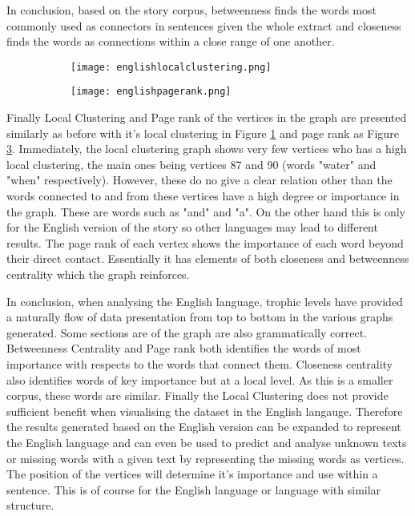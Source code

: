 In conclusion, based on the story corpus, betweenness finds the words most commonly used as connectors in sentences given the whole extract and closeness finds the words as connections within a close range of one another.

\begin{figure}[H]
\centering
\begin{subfigure}{.45\textwidth}
	\hspace{-1cm} 
	\texttt{[image: englishlocalclustering.png]}
	\caption{}
	\label{fig:englc}
\end{subfigure}
\hfill
\begin{subfigure}{.45\textwidth}
	\hspace{-1cm} 
	\texttt{[image: englishpagerank.png]}
	\caption{}
	\label{fig:engpr}
\end{subfigure}
\end{figure}

Finally Local Clustering and Page rank of the vertices in the graph are presented similarly as before with it's local clustering in Figure \ref{fig:englc} and page rank as Figure \ref{fig:engpr}. Immediately, the local clustering graph shows very few vertices who has a high local clustering, the main ones being vertices 87 and 90 (words "water" and "when" respectively). However, these do no give a clear relation other than the words connected to and from these vertices have a high degree or importance in the graph. These are words such as "and" and "a". On the other hand this is only for the English version of the story so other languages may lead to different results. The page rank of each vertex shows the importance of each word beyond their direct contact. Essentially it has elements of both closeness and betweenness centrality which the graph reinforces.

In conclusion, when analysing the English language, trophic levels have provided a naturally flow of data presentation from top to bottom in the various graphs generated. Some sections are of the graph are also grammatically correct. Betweenness Centrality and Page rank both identifies the words of most importance with respects to the words that connect them. Closeness centrality also identifies words of key importance but at a local level. As this is a smaller corpus, these words are similar. Finally the Local Clustering does not provide sufficient benefit when visualising the dataset in the English langauge. Therefore the results generated based on the English version can be expanded to represent the English language and can even be used to predict and analyse unknown texts or missing words with a given text by representing the missing words as vertices. The position of the vertices will determine it's importance and use within a sentence. This is of course for the English language or language with similar structure.

